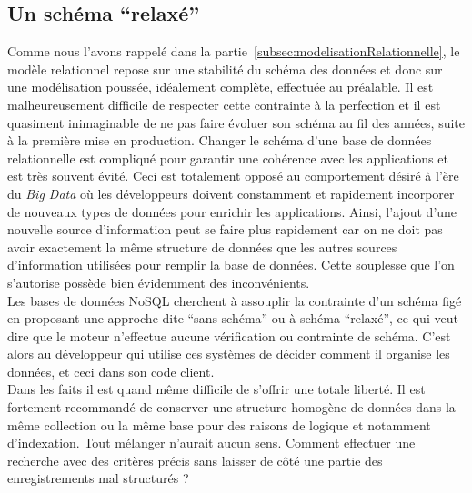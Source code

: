 
\subsection*{Un schéma \enquote{relaxé}}
	Comme nous l'avons rappelé dans la partie~\ref{subsec:modelisationRelationnelle}, le modèle relationnel repose sur une stabilité du schéma des données et donc sur une modélisation poussée, idéalement complète, effectuée au préalable. Il est malheureusement difficile de respecter cette contrainte à la perfection et il est quasiment inimaginable de ne pas faire évoluer son schéma au fil des années, suite à la première mise en production. Changer le schéma d'une base de données relationnelle est compliqué pour garantir une cohérence avec les applications et est très souvent évité. Ceci est totalement opposé au comportement désiré à l'ère du \textit{Big Data} où les développeurs doivent constamment et rapidement incorporer de nouveaux types de données pour enrichir les applications. Ainsi, l'ajout d'une nouvelle source d'information peut se faire plus rapidement car on ne doit pas avoir exactement la même structure de données que les autres sources d'information utilisées pour remplir la base de données. Cette souplesse que l'on s'autorise possède bien évidemment des inconvénients.\\

	Les bases de données NoSQL cherchent à assouplir la contrainte d'un schéma figé en proposant une approche dite \enquote{sans schéma} ou à schéma \enquote{relaxé}, ce qui veut dire que le moteur n'effectue aucune vérification ou contrainte de schéma. C'est alors au développeur qui utilise ces systèmes de décider comment il organise les données, et ceci dans son code client.\\

	Dans les faits il est quand même difficile de s'offrir une totale liberté. Il est fortement recommandé de conserver une structure homogène de données dans la même collection ou la même base pour des raisons de logique et notamment d'indexation. Tout mélanger n'aurait aucun sens. Comment effectuer une recherche avec des critères précis sans laisser de côté une partie des enregistrements mal structurés ?\\

